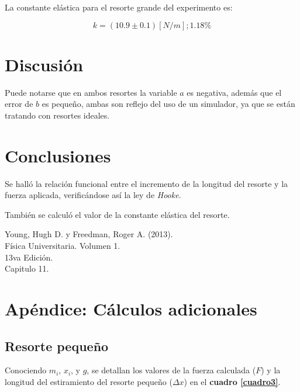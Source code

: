\documentclass[letter,11pt]{article}
\begin{document}
La constante elástica para el resorte grande del experimento es:

\begin{equation*}
    k = (10.9 \pm 0.1) [N/m]; 1.18\%
\end{equation*}
\vspace{0.10cm}

\section{Discusión}

Puede notarse que en ambos resortes la variable $a$ es negativa, además que
el error de $b$ es pequeño, ambas son reflejo del uso de un simulador, ya que se
están tratando con resortes ideales.

\section{Conclusiones}

Se halló la relación funcional entre el incremento de la longitud del resorte y
la fuerza aplicada, verificándose así la ley de \emph{Hooke}.

También se calculó el valor de la constante elástica del resorte.

\begin{thebibliography}{99}

 Young, Hugh D. y Freedman, Roger A. (2013).\\
Física Universitaria. Volumen 1.\\
13va Edición.\\
Capitulo 11.

\end{thebibliography}

\newpage
\section*{Apéndice: Cálculos adicionales}

\subsection{Resorte pequeño}

Conociendo $m_i$, $x_i$, y $g$, se detallan los valores de la fuerza calculada
($F$) y la longitud del estiramiento del resorte pequeño ($\Delta x$) en el
\textbf{cuadro \ref{cuadro3}}.
\end{document}
